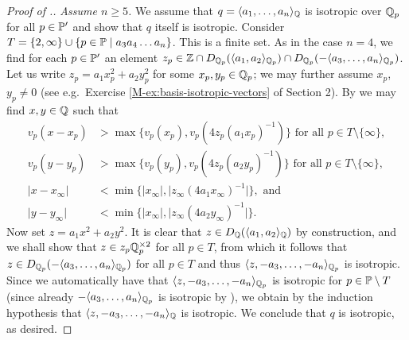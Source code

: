 \documentclass[12pt, leqno, british]{amsart}
\begin{document}
\begin{proof}[Proof of .]
\emph{Assume $n \geq 5$.}
We assume that $q = \langle a_1, \ldots, a_n \rangle_{\mathbb Q}$ is isotropic over $\mathbb Q_p$ for all $p \in \mathbb P'$ and show that $q$ itself is isotropic.
Consider $T = \lbrace 2, \infty \rbrace \cup \lbrace p \in \mathbb P \mid a_3a_4\ldots a_n \rbrace$.
This is a finite set.
As in the case $n = 4$, we find for each $p \in \mathbb P'$ an element $z_p \in \mathbb Z \cap D_{\mathbb Q_p}(\langle a_1, a_2 \rangle_{\mathbb Q_p}) \cap D_{\mathbb Q_p}(-\langle a_3, \ldots, a_n \rangle_{\mathbb Q_p})$.
Let us write $z_p = a_1x_p^2 + a_2y_p^2$ for some $x_p, y_p \in \mathbb Q_p$; we may further assume $x_p$, $y_p \neq 0$ (see e.g.~Exercise \eqref{M-ex:basis-isotropic-vectors} of Section 2).
By  we may find $x, y \in \mathbb Q$ such that
\begin{align*}
v_p(x - x_p) &> \max \lbrace v_p(x_p), v_p(4z_p(a_1x_p)^{-1}) \rbrace \text{ for all } p \in T \setminus \lbrace \infty \rbrace,\\
v_p(y - y_p) &> \max \lbrace v_p(y_p), v_p(4z_p(a_2y_p)^{-1}) \rbrace \text{ for all } p \in T \setminus \lbrace \infty \rbrace,\\
\lvert x - x_\infty \rvert &< \min \lbrace \lvert x_\infty \rvert, \lvert z_\infty (4a_1x_\infty)^{-1} \rvert \rbrace, \text{ and} \\
\lvert y - y_\infty \rvert &< \min \lbrace \lvert x_\infty \rvert, \lvert z_\infty (4a_2y_\infty)^{-1} \rvert \rbrace.
\end{align*}
Now set $z = a_1x^2 + a_2y^2$.
It is clear that $z \in D_\mathbb Q(\langle a_1, a_2 \rangle_\mathbb Q)$ by construction, and we shall show that $z \in z_p\mathbb Q_p^{\times 2}$ for all $p \in T$, from which it follows that $z \in D_{\mathbb Q_p}(-\langle a_3, \ldots, a_n \rangle_{\mathbb Q_p})$ for all $p \in T$ and thus $\langle z, -a_3, \ldots, -a_n \rangle_{\mathbb Q_p}$ is isotropic.
Since we automatically have that $\langle z, -a_3, \ldots, -a_n \rangle_{\mathbb Q_p}$ is isotropic for $p \in \mathbb P \setminus T$ (since already $-\langle a_3, \ldots, a_n \rangle_{\mathbb Q_p}$ is isotropic by ), we obtain by the induction hypothesis that $\langle z, -a_3, \ldots, -a_n \rangle_{\mathbb Q}$ is isotropic.
We conclude that $q$ is isotropic, as desired.


\end{proof}
\end{document}
